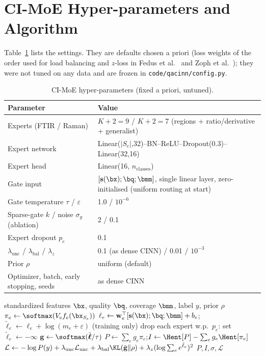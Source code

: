 \section{CI-MoE Hyper-parameters and Algorithm}\label{app:algo}
Table~\ref{tab:moehp} lists the settings. They are defaults chosen a priori (loss weights of the order used for load balancing and $z$-loss in Fedus et al.\ \cite{b20} and Zoph et al.\ \cite{b64}); they were not tuned on any data and are frozen in \texttt{code/qacinn/config.py}.
\begin{table}[H]\centering\small
\caption{CI-MoE hyper-parameters (fixed a priori, untuned).}\label{tab:moehp}
\begin{tabular}{p{4.2cm}p{10.4cm}}\toprule Parameter & Value\\\midrule
Experts (FTIR / Raman) & $K+2=9$ / $K+2=7$ (regions + ratio/derivative + generalist)\\
Expert network & Linear($|S_e|$,32)--BN--ReLU--Dropout(0.3)--Linear(32,16)\\
Expert head & Linear(16, $n_{\text{classes}}$)\\
Gate input & $[\mathbf s(\bx);\bq;\bmm]$, single linear layer, zero-initialised (uniform routing at start)\\
Gate temperature $\tau$ / $\varepsilon$ & 1.0 / $10^{-6}$\\ Sparse-gate $k$ / noise $\sigma_g$ (ablation) & 2 / 0.1\\ Expert dropout $p_e$ & 0.1\\
$\lambda_{\mathrm{unc}}$ / $\lambda_{\mathrm{bal}}$ / $\lambda_z$ & 0.1 (as dense CINN) / 0.01 / $10^{-3}$\\ Prior $\rho$ & uniform (default)\\
Optimizer, batch, early stopping, seeds & as dense CINN\\\bottomrule\end{tabular}\end{table}

\begin{algorithm}[H]\caption{CI-MoE forward pass and loss for one modality (mini-batch of size $B$)}\label{alg:moe}
\begin{algorithmic}[1]
\Require standardized features $\bx$, quality $\bq$, coverage $\bmm$, label $y$, prior $\rho$
\State $\pi_e\gets\softmax(V_ef_e(\bx_{S_e}))$\EndFor
\State $\ell_e\gets\mathbf w_e^\top[\mathbf s(\bx);\bq;\bmm]+b_e$;\quad $\tilde\ell_e\gets\ell_e+\log(m_e+\varepsilon)$
\State (training only) drop each expert w.p.\ $p_e$: set $\tilde\ell_e\gets-\infty$
\State $\mathbf g\gets\softmax(\tilde{\boldsymbol\ell}/\tau)$
\State $P\gets\sum_eg_e\pi_e$;\quad $I\gets\Hent[P]-\sum_eg_e\Hent[\pi_e]$
\State $\mathcal{L}\gets-\log P(y)+\lambda_{\mathrm{unc}}\mathcal{L}_{\mathrm{unc}}+\lambda_{\mathrm{bal}}\KL(\bar{\mathbf g}\|\rho)+\lambda_z(\log\sum_ee^{\tilde\ell_e})^2$
\State \Return $P,I,\sigma,\mathcal{L}$
\end{algorithmic}\end{algorithm}

